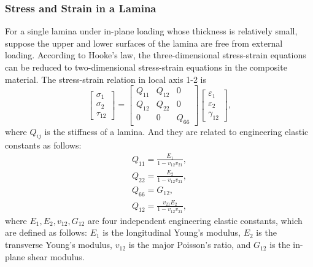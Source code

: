 \documentclass[letterpaper]{IEEEtran}
\begin{document}
\subsubsection{Stress and Strain in a Lamina}
For a single lamina under in-plane loading whose thickness is relatively small,
suppose the upper and lower surfaces of the lamina are free from external
loading. According to Hooke's law, the three-dimensional stress-strain
equations can be reduced to two-dimensional stress-strain equations in the
composite material. The stress-strain relation in local axis 1-2 is
\begin{equation}
	\left[
		\begin{array}{l}
        	\sigma _1\\
        	\sigma _2\\
        	\tau_{12}
    	\end{array}
	\right]
    =
	\left[
		\begin{array}{ccc}
        	Q_{11} & Q_{12} & 0\\
        	Q_{12} & Q_{22} & 0\\
        	0      & 0     & Q_{66}
    	\end{array}
	\right]
	\left[
		\begin{array}{l}
        	\varepsilon_1\\
        	\varepsilon_2\\
			\gamma_{12}
		\end{array} 
	\right]\textstyle{,}
\end{equation}
where $Q_{ij} $ is the stiffness of a lamina. And they are related to
engineering elastic constants as follows:
\begin{equation}
	\begin{array}{l}
		Q_{11}=\frac{E_1}{1-v_{12}v_{21}} \textstyle{,} \\
    	Q_{22}=\frac{E_2}{1-v_{12}v_{21}} \textstyle{,}\\
    	Q_{66}=G_{12} \textstyle{,}\\
    	Q_{12}=\frac{v_{21}E_2}{1-v_{12}v_{21}} \textstyle{,}
    \end{array}
\end{equation}
where $E_1, E_2, v_{12}, G_{12} $ are four independent engineering elastic
constants, which are defined as follows: $E_1 $ is the longitudinal Young's
modulus, $E_2 $ is the transverse Young's modulus, $v_{12} $ is the major
Poisson's ratio, and $G_{12} $ is the in-plane shear modulus.
\end{document}
